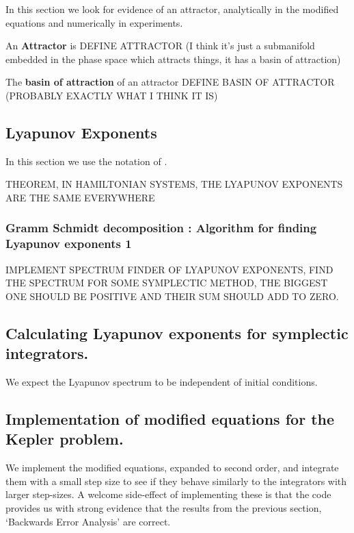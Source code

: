 \documentclass[12pt]{article}
\begin{document}
In this section we look for evidence of an attractor, analytically in the modified equations and numerically in experiments. 

An \textbf{Attractor} is DEFINE ATTRACTOR (I think it's just a submanifold embedded in the phase space which attracts things, it has a basin of attraction)

The \textbf{basin of attraction} of an attractor DEFINE BASIN OF ATTRACTOR (PROBABLY EXACTLY WHAT I THINK IT IS)



\subsection{Lyapunov Exponents}
In this section we use the notation of \cite{PikovskyPoliti}.


THEOREM, IN HAMILTONIAN SYSTEMS, THE LYAPUNOV EXPONENTS ARE THE SAME EVERYWHERE

\subsubsection{Gramm Schmidt decomposition : Algorithm for finding Lyapunov exponents 1}


IMPLEMENT SPECTRUM FINDER OF LYAPUNOV EXPONENTS, FIND THE SPECTRUM FOR SOME SYMPLECTIC METHOD, THE BIGGEST ONE SHOULD BE POSITIVE AND THEIR SUM SHOULD ADD TO ZERO.


\subsection{Calculating Lyapunov exponents for symplectic integrators.}
We expect the Lyapunov spectrum to be independent of initial conditions. 

\subsection{Implementation of modified equations for the Kepler problem.}
We implement the modified equations, expanded to second order, and integrate them with a small step size to see if they behave similarly to the integrators with larger step-sizes. A welcome side-effect of implementing these is that the code provides us with strong evidence that the results from the previous section, `Backwards Error Analysis' are correct. 

\end{document}
